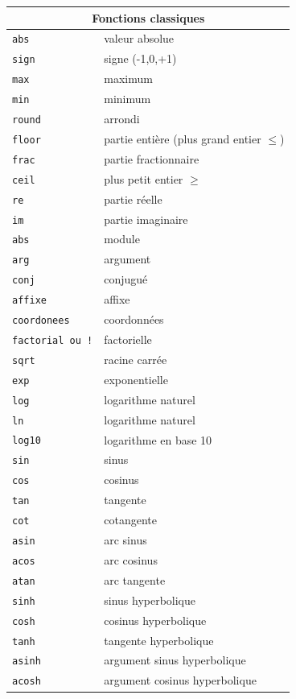 \documentclass{article}
\begin{document}
\begin{giacjshere}
\begin{center}
\begin{tabular}{|ll|}
\hline
\multicolumn{2}{|c|}{\bf Fonctions classiques}\\
\hline\hline
\verb|abs| & valeur absolue\\
\verb|sign| & signe (-1,0,+1)\\
\verb|max| & maximum\\
\verb|min| & minimum\\
\verb|round| & arrondi \\
\verb|floor| & partie enti\`ere (plus grand entier $\leq$)\\
\verb|frac| & partie fractionnaire\\
\verb|ceil| & plus petit entier $\geq $\\
\hline
\verb|re| & partie r\'eelle\\
\verb|im| & partie imaginaire\\
\verb|abs| & module\\
\verb|arg| & argument\\
\verb|conj| & conjugu\'e\\
\verb|affixe| & affixe\\
\verb|coordonees| & coordonn\'ees\\
\hline
\verb|factorial ou !| & factorielle\\
\verb|sqrt| & racine carr\'ee\\
\verb|exp| & exponentielle\\
\verb|log| & logarithme naturel\\
\verb|ln| & logarithme naturel\\
\verb|log10| & logarithme en base 10\\
\hline
\verb|sin| & sinus\\
\verb|cos| & cosinus\\
\verb|tan| & tangente\\
\verb|cot| & cotangente\\
\verb|asin| & arc sinus\\
\verb|acos| & arc cosinus\\
\verb|atan| & arc tangente\\
\hline
\verb|sinh| & sinus hyperbolique\\
\verb|cosh| & cosinus hyperbolique\\
\verb|tanh| & tangente hyperbolique\\
\verb|asinh| & argument sinus hyperbolique\\
\verb|acosh| & argument cosinus hyperbolique\\

\end{tabular}
\end{center}
\end{giacjshere}
\end{document}
